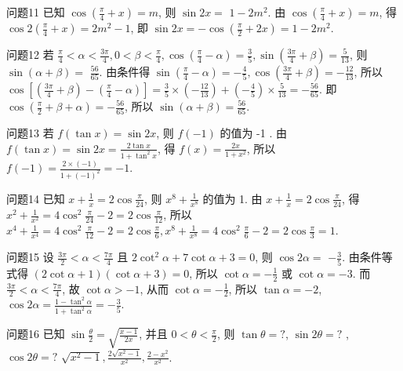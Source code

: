 问题11 已知 $\cos \left(\frac{\pi}{4}+x\right)=m$, 则 $\sin 2 x=$
$1-2 m^2$. 由 $\cos \left(\frac{\pi}{4}+x\right)=m$, 得 $\cos 2\left(\frac{\pi}{4}+x\right)=2 m^2-1$, 即 $\sin 2 x= -\cos \left(\frac{\pi}{2}+2 x\right)=1-2 m^2$.



问题12 若 $\frac{\pi}{4}<\alpha<\frac{3 \pi}{4}, 0<\beta<\frac{\pi}{4}, \cos \left(\frac{\pi}{4}-\alpha\right)=\frac{3}{5}, \sin \left(\frac{3 \pi}{4}+\beta\right)=\frac{5}{13}$, 则 $\sin (\alpha+\beta)=$
$\frac{56}{65}$. 由条件得 $\sin \left(\frac{\pi}{4}-\alpha\right)=-\frac{4}{5}, \cos \left(\frac{3 \pi}{4}+\beta\right)=-\frac{12}{13}$, 所以 $\cos \left[\left(\frac{3 \pi}{4}+\beta\right)-\left(\frac{\pi}{4}-\alpha\right)\right]=\frac{3}{5} \times\left(-\frac{12}{13}\right)+\left(-\frac{4}{5}\right) \times \frac{5}{13}=-\frac{56}{65}$. 即 $\cos \left(\frac{\pi}{2}+\beta+\alpha\right)=-\frac{56}{65}$, 所以 $\sin (\alpha+\beta)=\frac{56}{65}$.



问题13 若 $f(\tan x)=\sin 2 x$, 则 $f(-1)$ 的值为
-1 . 由 $f(\tan x)=\sin 2 x=\frac{2 \tan x}{1+\tan ^2 x}$, 得 $f(x)=\frac{2 x}{1+x^2}$, 所以 $f(-1)=\frac{2 \times(-1)}{1+(-1)^2}=-1$.



问题14 已知 $x+\frac{1}{x}=2 \cos \frac{\pi}{24}$, 则 $x^8+\frac{1}{x^8}$ 的值为
1. 由 $x+\frac{1}{x}=2 \cos \frac{\pi}{24}$, 得 $x^2+\frac{1}{x^2}=4 \cos ^2 \frac{\pi}{24}-2=2 \cos \frac{\pi}{12}$, 所以 $x^4+ \frac{1}{x^4}=4 \cos ^2 \frac{\pi}{12}-2=2 \cos \frac{\pi}{6}, x^8+\frac{1}{x^8}=4 \cos ^2 \frac{\pi}{6}-2=2 \cos \frac{\pi}{3}=1$.



问题15 设 $\frac{3 \pi}{2}<\alpha<\frac{7 \pi}{4}$ 且 $2 \cot ^2 \alpha+7 \cot \alpha+3=0$, 则 $\cos 2 \alpha=$
$-\frac{3}{5}$. 由条件等式得 $(2 \cot \alpha+1)(\cot \alpha+3)=0$, 所以 $\cot \alpha=-\frac{1}{2}$ 或
$\cot \alpha=-3$. 而 $\frac{3 \pi}{2}<\alpha<\frac{7 \pi}{4}$, 故 $\cot \alpha>-1$, 从而 $\cot \alpha=-\frac{1}{2}$, 所以 $\tan \alpha=-2$, $\cos 2 \alpha=\frac{1-\tan ^2 \alpha}{1+\tan ^2 \alpha}=-\frac{3}{5}$.



问题16 已知 $\sin \frac{\theta}{2}=\sqrt{\frac{x-1}{2 x}}$, 并且 $0<\theta<\frac{\pi}{2}$, 则 $\tan \theta=?$, $ \sin 2 \theta=?$ , $\cos 2 \theta=?$
$\sqrt{x^2-1}, \frac{2 \sqrt{x^2-1}}{x^2}, \frac{2-x^2}{x^2}$.




